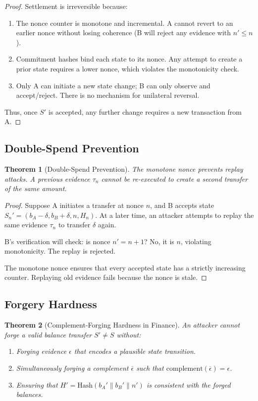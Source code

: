 \documentclass[twocolumn,10pt,a4paper]{article}
\theoremstyle{plain}
\newtheorem{theorem}{Theorem}[section]
\theoremstyle{definition}
\newcommand{\comp}[1]{\overline{#1}}
\begin{document}
\begin{proof}
Settlement is irreversible because:
\begin{enumerate}
\item The nonce counter is monotone and incremental. A cannot revert to an earlier nonce without losing coherence (B will reject any evidence with $n' \leq n$).
\item Commitment hashes bind each state to its nonce. Any attempt to create a prior state requires a lower nonce, which violates the monotonicity check.
\item Only A can initiate a new state change; B can only observe and accept/reject. There is no mechanism for unilateral reversal.
\end{enumerate}
Thus, once $S'$ is accepted, any further change requires a new transaction from A.
\end{proof}

\subsection{Double-Spend Prevention}

\begin{theorem}[Double-Spend Prevention]
The monotone nonce prevents replay attacks. A previous evidence $\tau_n$ cannot be re-executed to create a second transfer of the same amount.
\end{theorem}

\begin{proof}
Suppose A initiates a transfer at nonce $n$, and B accepts state $S_n' = (b_A - \delta, b_B + \delta, n, H_n)$. At a later time, an attacker attempts to replay the same evidence $\tau_n$ to transfer $\delta$ again.

B's verification will check: is nonce $n' = n + 1$? No, it is $n$, violating monotonicity. The replay is rejected.

The monotone nonce ensures that every accepted state has a strictly increasing counter. Replaying old evidence fails because the nonce is stale.
\end{proof}

\subsection{Forgery Hardness}

\begin{theorem}[Complement-Forging Hardness in Finance]
An attacker cannot forge a valid balance transfer $S' \neq S$ without:
\begin{enumerate}
\item Forging evidence $\epsilon$ that encodes a plausible state transition.
\item Simultaneously forging a complement $\comp{\epsilon}$ such that $\mathrm{complement}(\comp{\epsilon}) = \epsilon$.
\item Ensuring that $H' = \mathrm{Hash}(b_A' \| b_B' \| n')$ is consistent with the forged balances.
\end{enumerate}
\end{theorem}
\end{document}
